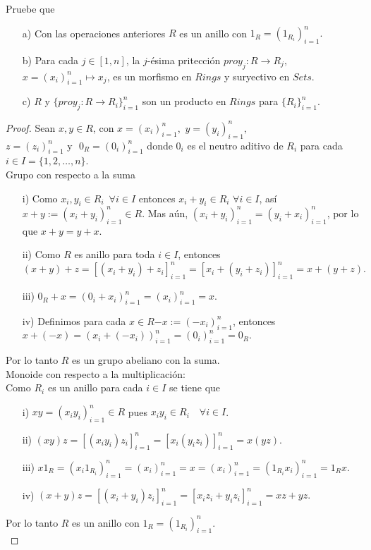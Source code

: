 \documentclass{article}
\begin{document}
\begin{enumerate}[label=\textbf{Ej \arabic*.}]
		Pruebe que 
		\begin{enumerate}
			\item[a)] Con las operaciones anteriores $R$ es un anillo con $1_R=(1_{R_i})_{i=1}^n.$
			\item[b)] Para cada $j\in [1,n]$, la $j$-ésima pritección $proy_j:R\to R_j,$\\ $x=(x_i)_{i=1}^n\mapsto x_j$, es un morfismo en $Rings$ y 
			suryectivo en $Sets$.
			\item[c)] $R$ y $\{proy_j:R\to R_i\}_{i=1}^n$ son un producto en $Rings$ para $\{R_i\}_{i=1}^n$.
		\end{enumerate}
		\begin{proof}
			 Sean $x,y\in R$, con $x=(x_i)_{i=1}^n,\,\,y=(y_i)_{i=1}^n,$\\ 
			$z=(z_i)_{i=1}^n\,\,$y \,\,$0_R=(0_i)_{i=1}^n$ donde $0_i$ es el neutro aditivo de $R_i$ para cada $i\in I=\{1,2,\ldots,n\}$.\\
			
			Grupo con respecto a la suma
			\begin{itemize}
				\item[i)] Como $x_i,y_i\in R_i\,\,\,\forall i\in I$ entonces $x_i+y_i\in R_i\,\,\forall i\in I$, así \\$x+y:=(x_i+y_i)_{i=1}^n\in R$. Mas aún, 
				$(x_i+y_i)_{i=1}^n=(y_i+x_i)_{i=1}^n$, por lo que $x+y=y+x$.
				\item[ii)] Como $R$ es anillo para toda $i\in I$, entonces 
				\[(x+y)+z=[(x_i+y_i)+z_i]_{i=1}^n=[x_i+(y_i+z_i)]_{i=1}^n=x+(y+z).\]
				\item[iii)] $0_R+x=(0_i+x_i)_{i=1}^n=(x_i)_{i=1}^n=x$.
				\item[iv)] Definimos para cada $x\in R$\quad $-x:=(-x_i)_{i=1}^n$, entonces \\$x+(-x)=(x_i+(-x_i))_{i=1}^n=(0_i)_{i=1}^n=0_R.$
			\end{itemize}
			Por lo tanto $R$ es un grupo abeliano con la suma.\\
			
			Monoide con respecto a la multiplicación:\\
			
			Como $R_i$ es un anillo para cada $i\in I$ se tiene que
			\begin{itemize}
				\item[i)] $xy=(x_iy_i)_{i=1}^n\in R$ pues $x_iy_i\in R_i\quad \forall i\in I$.
				\item[ii)] $(xy)z=[(x_iy_i)z_i]_{i=1}^n=[x_i(y_iz_i)]_{i=1}^n=x(yz)$.
				\item[iii)] $x1_R=(x_i1_{R_i})_{i=1}^n=(x_i)_{i=1}^n=x=(x_i)_{i=1}^n=(1_{R_i}x_i)_{i=1}^n=1_Rx$.
				\item[iv)] $(x+y)z=[(x_i+y_i)z_i]^n_{i=1}=[x_iz_i+y_iz_i]^n_{i=1}=xz+yz.$
			\end{itemize}
			Por lo tanto $R$ es un anillo con $1_R=(1_{R_i})_{i=1}^n$.\\
			

\end{proof}
\end{enumerate}
\end{document}
